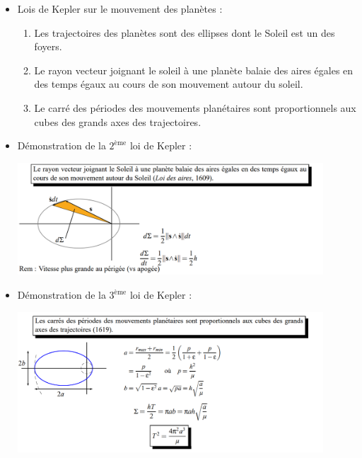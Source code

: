 \documentclass[a4paper]{article}
\begin{document}
\begin{itemize}
\item Lois de Kepler sur le mouvement des planètes : 
\begin{enumerate}
\item Les trajectoires des planètes sont des ellipses dont le Soleil est un des foyers.
\item Le rayon vecteur joignant le soleil à une planète balaie des aires égales en des temps égaux au cours de son mouvement autour du soleil.
\item Le carré des périodes des mouvements planétaires sont proportionnels aux cubes des grands axes des trajectoires.
\end{enumerate}





\item Démonstration de la $ 2^{\text{ème}} $ loi de Kepler : 

\begin{center}
\includegraphics[width=0.9\textwidth]{images/AireKepler.PNG}
\end{center}






\item Démonstration de la $ 3^{\text{ème}} $ loi de Kepler : 

\begin{center}
\includegraphics[width=0.9\textwidth]{images/RevolutionKepler.PNG}
\end{center}





\end{itemize}
\end{document}
